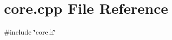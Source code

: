 \section{core.\+cpp File Reference}
\label{core_8cpp}
{\ttfamily \#include \char`\"{}core.\+h\char`\"{}}\newline
